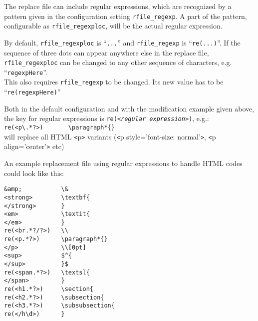 \documentclass{article}
\newcommand{\vs}{\vspace{3mm}}
\begin{document}
The replace file can include regular expressions, which are recognized by a pattern given in the configuration setting \texttt{rfile\_regexp}. A part of the pattern, configurable as \texttt{rfile\_regexploc}, will be the actual regular expression.

\vs

By default, \texttt{rfile\_regexploc} is ``\texttt{...}'' and \texttt{rfile\_regexp} is ``\texttt{re(...)}''. If the sequence of three dots can appear anywhere else in the replace file, \texttt{rfile\_regexploc} can be changed to any other sequence of characters, e.g. ``\texttt{regexpHere}''.\\
This also requires \texttt{rfile\_regexp} to be changed. Its new value has to be ``\texttt{re(regexpHere)}''
 
\vs

Both in the default configuration and with the modification example given above, the key for regular expressions is \texttt{re(<\textit{regular expression}>)}, e.g.:\\
\hspace{3mm}\verb+re(<p\.*?>)		\paragraph*{}+ \\
will replace all HTML \texttt{<}p\texttt{>} variants (\texttt{<}p style='font-size: normal'\texttt{>}, \texttt{<}p align='center'\texttt{>} etc)

\vs

An example replacement file using regular expressions to handle HTML codes could look like this:

\noindent\begin{verbatim}
&amp;           \&
<strong>        \textbf{
</strong>       }
<em>            \textit{
</em>           }
re(<br.*?/?>)   \\
re(<p.*?>)      \paragraph*{}
</p>            \\[0pt]
<sup>           $^{
</sup>          }$
re(<span.*?>)   \textsl{
</span>         }
re(<h1.*?>)     \section{
re(<h2.*?>)     \subsection{
re(<h3.*?>)     \subsubsection{
re(</h\d>)      }
\end{verbatim}
\end{document}

